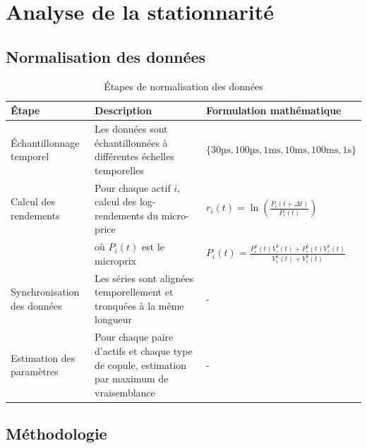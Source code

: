 \documentclass[10pt,a4paper]{article}
\theoremstyle{definition}
\theoremstyle{remark}
\begin{document}
\newpage
\section{Analyse de la stationnarité}

\subsection{Normalisation des données}

\begin{landscape}
\begin{table}[h!]
\centering
\begin{tabular}{|p{4cm}|p{6cm}|p{6cm}|}
\hline
\textbf{Étape} & \textbf{Description} & \textbf{Formulation mathématique} \\
\hline
Échantillonnage temporel & Les données sont échantillonnées à différentes échelles temporelles & $\{\text{30µs}, \text{100µs}, \text{1ms}, \text{10ms}, \text{100ms}, \text{1s}\}$ \\
\hline
Calcul des rendements & Pour chaque actif $i$, calcul des log-rendements du micro-price & $r_i(t) = \ln\left(\frac{P_i(t+\Delta t)}{P_i(t)}\right)$ \\
& où $P_i(t)$ est le microprix & $P_i(t) = \frac{P^a_i(t)V^b_i(t) + P^b_i(t)V^a_i(t)}{V^a_i(t) + V^b_i(t)}$ \\
\hline
Synchronisation des données & Les séries sont alignées temporellement et tronquées à la même longueur & - \\
\hline
Estimation des paramètres & Pour chaque paire d'actifs et chaque type de copule, estimation par maximum de vraisemblance & - \\
\hline
\end{tabular}
\caption{Étapes de normalisation des données}
\label{tab:norm_steps}
\end{table}
\end{landscape}


\subsection{Méthodologie}
\end{document}
